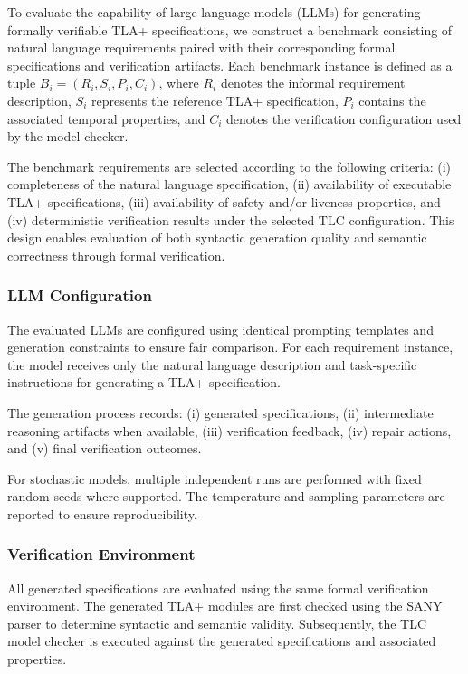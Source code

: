 To evaluate the capability of large language models (LLMs) for generating formally
verifiable TLA+ specifications, we construct a benchmark consisting of natural
language requirements paired with their corresponding formal specifications and
verification artifacts. Each benchmark instance is defined as a tuple
$B_i=(R_i,S_i,P_i,C_i)$, where $R_i$ denotes the informal requirement description,
$S_i$ represents the reference TLA+ specification, $P_i$ contains the associated
temporal properties, and $C_i$ denotes the verification configuration used by the
model checker.

The benchmark requirements are selected according to the following criteria:
(i) completeness of the natural language specification,
(ii) availability of executable TLA+ specifications,
(iii) availability of safety and/or liveness properties,
and (iv) deterministic verification results under the selected TLC configuration.
This design enables evaluation of both syntactic generation quality and semantic
correctness through formal verification.

\subsubsection{LLM Configuration}

The evaluated LLMs are configured using identical prompting templates and
generation constraints to ensure fair comparison. For each requirement instance,
the model receives only the natural language description and task-specific
instructions for generating a TLA+ specification.

The generation process records:
(i) generated specifications,
(ii) intermediate reasoning artifacts when available,
(iii) verification feedback,
(iv) repair actions, and
(v) final verification outcomes.

For stochastic models, multiple independent runs are performed with fixed random
seeds where supported. The temperature and sampling parameters are reported to
ensure reproducibility.

\subsubsection{Verification Environment}

All generated specifications are evaluated using the same formal verification
environment. The generated TLA+ modules are first checked using the SANY parser
to determine syntactic and semantic validity. Subsequently, the TLC model checker
is executed against the generated specifications and associated properties.

